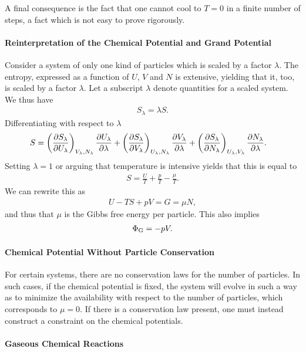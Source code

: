 A final consequence is the fact that one cannot cool to $T = 0$ in a finite number of steps, a fact which is not easy to prove rigorously.


\paragraph{Reinterpretation of the Chemical Potential and Grand Potential}
Consider a system of only one kind of particles which is scaled by a factor $\lambda$. The entropy, expressed as a function of $U$, $V$ and $N$ is extensive, yielding that it, too, is scaled by a factor $\lambda$. Let a subscript $\lambda$ denote quantities for a scaled system. We thus have
\begin{align*}
	S_{\lambda} = \lambda S.
\end{align*}
Differentiating with respect to $\lambda$ 
\begin{align*}
	S &= \left(\pdv{S_{\lambda}}{U_{\lambda}}\right)_{V_{\lambda}, N_{\lambda}}\pdv{U_{\lambda}}{\lambda} + \left(\pdv{S_{\lambda}}{V_{\lambda}}\right)_{U_{\lambda}, N_{\lambda}}\pdv{V_{\lambda}}{\lambda} + \left(\pdv{S_{\lambda}}{N_{\lambda}}\right)_{U_{\lambda}, V_{\lambda}}\pdv{N_{\lambda}}{\lambda}.
\end{align*}
Setting $\lambda = 1$ or arguing that temperature is intensive yields that this is equal to
\begin{align*}
	S = \frac{U}{T} + \frac{p}{T} - \frac{\mu}{T}. 
\end{align*}
We can rewrite this as
\begin{align*}
	U - TS + pV = G = \mu N,
\end{align*}
and thus that $\mu$ is the Gibbs free energy per particle. This also implies
\begin{align*}
	\Phi_{\text{G}} = -pV.
\end{align*}

\paragraph{Chemical Potential Without Particle Conservation}
For certain systems, there are no conservation laws for the number of particles. In such cases, if the chemical potential is fixed, the system will evolve in such a way as to minimize the availability with respect to the number of particles, which corresponds to $\mu = 0$. If there is a conservation law present, one must instead construct a constraint on the chemical potentials.

\paragraph{Gaseous Chemical Reactions}